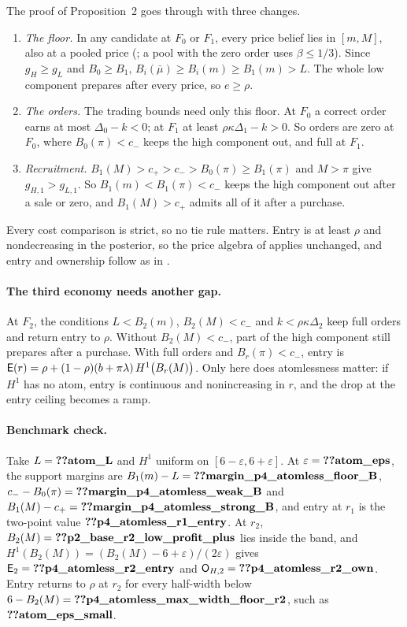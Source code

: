 The proof of Proposition~2 goes through with three changes.
\begin{enumerate}[leftmargin=2em]
\item \emph{The floor.} In any candidate at \(F_0\) or \(F_1\), every price belief lies in \([m,M]\), also at a pooled price
(; a pool with the zero order uses \(\beta\le1/3\)). Since \(g_H\ge g_L\) and
\(B_0\ge B_1\), \(B_i(\bar\mu)\ge B_i(m)\ge B_1(m)>L\). The whole low component prepares after every price, so
\(e\ge\rho\).
\item \emph{The orders.} The trading bounds need only this floor. At \(F_0\) a correct order earns at most
\(\Delta_0-k<0\); at \(F_1\) at least \(\rho\kappa\Delta_1-k>0\). So orders are zero at \(F_0\), where
\(B_0(\pi)<c_-\) keeps the high component out, and full at \(F_1\).
\item \emph{Recruitment.} \(B_1(M)>c_+>c_->B_0(\pi)\ge B_1(\pi)\) and \(M>\pi\) give \(g_{H,1}>g_{L,1}\). So
\(B_1(m)<B_1(\pi)<c_-\) keeps the high component out after a sale or zero, and \(B_1(M)>c_+\) admits all of it after a
purchase.
\end{enumerate}
Every cost comparison is strict, so no tie rule matters. Entry is at least \(\rho\) and nondecreasing in the
posterior, so the price algebra of  applies unchanged, and entry and ownership
follow as in .

\paragraph{The third economy needs another gap.}
At \(F_2\), the conditions \(L<B_2(m)\), \(B_2(M)<c_-\) and \(k<\rho\kappa\Delta_2\) keep full orders and return entry
to \(\rho\). Without \(B_2(M)<c_-\), part of the high component still prepares after a purchase. With full orders and
\(B_r(\pi)<c_-\), entry is \(\mathsf{E}(r)=\rho+(1-\rho)(b+\pi\lambda)\,H^1\bigl(B_r(M)\bigr)\). Only here does atomlessness
matter: if \(H^1\) has no atom, entry is continuous and nonincreasing in \(r\), and the drop at the entry ceiling
becomes a ramp.

\paragraph{Benchmark check.}
Take \(L=\reg{atom_L}\) and \(H^1\) uniform on \([6-\varepsilon,6+\varepsilon]\). At \(\varepsilon=\reg{atom_eps}\),
the support margins are \(B_1(m)-L=\reg{margin_p4_atomless_floor_B}\), \(c_--B_0(\pi)=\reg{margin_p4_atomless_weak_B}\)
and \(B_1(M)-c_+=\reg{margin_p4_atomless_strong_B}\), and entry at \(r_1\) is the two-point value
\(\reg{p4_atomless_r1_entry}\). At \(r_2\), \(B_2(M)=\reg{p2_base_r2_low_profit_plus}\) lies inside the band, and
\(H^1(B_2(M))=(B_2(M)-6+\varepsilon)/(2\varepsilon)\) gives \(\Ent_2=\reg{p4_atomless_r2_entry}\) and
\(\Own_{H,2}=\reg{p4_atomless_r2_own}\). Entry returns to \(\rho\) at \(r_2\) for every half-width below
\(6-B_2(M)=\reg{p4_atomless_max_width_floor_r2}\), such as \(\reg{atom_eps_small}\).

